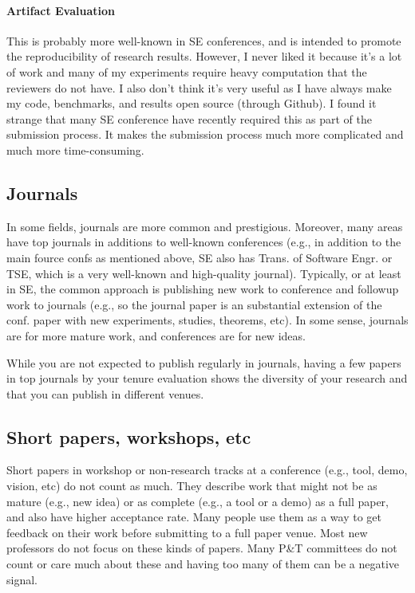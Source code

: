 \documentclass[oneside,11pt,dvipsnames]{book}
\begin{document}
\paragraph{Artifact Evaluation} This is probably more well-known in SE conferences, and is intended to promote the reproducibility of research results. However, I never liked it because it's a lot of work and many of my experiments require heavy computation that the reviewers do not have.  I also don't think it's very useful as I have always make my code, benchmarks, and results open source (through Github). I found it strange that many SE conference have recently required this as part of the submission process. It makes the submission process much more complicated and much more time-consuming.


\subsection{Journals}
In some fields, journals are more common and prestigious. Moreover, many areas have top journals in additions to well-known conferences (e.g., in addition to the main fource confs as mentioned above, SE also has Trans. of Software Engr. or TSE, which is a very well-known and high-quality journal).  Typically, or at least in SE, the common approach is publishing new work to conference and followup work to journals (e.g., so the journal paper is an substantial extension of the conf. paper with new experiments, studies, theorems, etc). In some sense, journals are for more mature work, and conferences are for new ideas.

While you are not expected to publish regularly in journals, having a few papers in top journals by your tenure evaluation shows the diversity of your research and that you can publish in different venues.



\subsection{Short papers, workshops, etc} Short papers in workshop or non-research tracks at a conference (e.g., tool, demo, vision, etc) do not count as much.
They describe work that might not be as mature (e.g., new idea) or as complete (e.g., a tool or a demo) as a full paper, and also have higher acceptance rate. Many people use them as a way to get feedback on their work before submitting to a full paper venue.  Most new professors do not focus on these kinds of papers. Many P\&T committees do not count or care much about these and having too many of them can be a negative signal.
\end{document}

